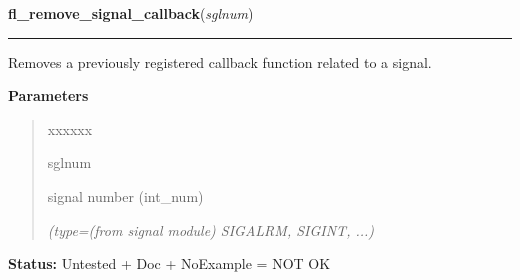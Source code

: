 \hspace{.8\funcindent}\begin{boxedminipage}{\funcwidth}

    \raggedright \textbf{fl\_remove\_signal\_callback}(\textit{sglnum})

    \vspace{-1.5ex}

    \rule{\textwidth}{0.5\fboxrule}
\setlength{\parskip}{2ex}
    Removes a previously registered callback function related to a signal.

\setlength{\parskip}{1ex}
      \textbf{Parameters}
      \vspace{-1ex}

      \begin{quote}
        \begin{Ventry}{xxxxxx}

          \item[sglnum]

          signal number (int\_num)

            {\it (type=(from signal module) SIGALRM, SIGINT, ...)}

        \end{Ventry}

      \end{quote}

\textbf{Status:} Untested + Doc + NoExample = NOT OK



    \end{boxedminipage}

    \label{xformslib:library:fl_signal_caught}

    \vspace{0.5ex}

